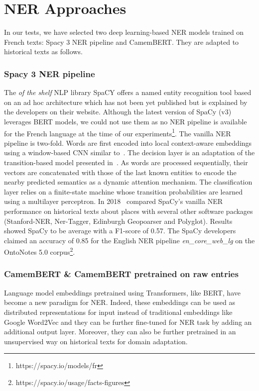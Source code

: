 \section{NER Approaches}

In our tests, we have selected two deep learning-based NER models trained on French texts: Spacy 3 NER pipeline and CamemBERT. They are adapted to  historical texts as follows.

\subsubsection{Spacy 3 NER pipeline}
The \textit{of the shelf} NLP library SpaCY offers a named entity recognition tool based on an ad hoc architecture which has not been yet published but is explained by the developers on their website. Although the latest version of SpaCy (v3) leverages BERT models, we could not use them as no NER pipeline is available for the French language at the time of our experiments\footnote{https://spacy.io/models/fr}.
The vanilla NER pipeline is two-fold. Words are first encoded into local context-aware embeddings using a window-based CNN similar to~\cite{collobert2011}.
The decision layer is an adaptation of the transition-based model presented in~\cite{lample2016}.
As words are processed sequentially, their vectors are concatenated with those of the last known entities to encode the nearby predicted semantics as a dynamic attention mechanism.
The classification layer relies on a finite-state machine whose transition probabilities are learned using a multilayer perceptron.
In 2018~\cite{won2018} compared SpaCy's vanilla NER performance on historical texts about places with several other software packages (Stanford-NER, Ner-Tagger, Edinburgh Geopoarser and Polyglot). Results showed SpaCy to be average with a F1-score of 0.57.
The SpaCy developers claimed an accuracy of 0.85 for the English NER pipeline \textit{en\_core\_web\_lg} on the OntoNotes 5.0 corpus\footnote{https://spacy.io/usage/facts-figures}.

\subsubsection{CamemBERT \& CamemBERT pretrained on raw entries}

Language model embeddings pretrained using Transformers, like BERT, have become a new paradigm for NER\cite{li2020}. Indeed, these embeddings can be used as distributed representations for input instead of traditional embeddings like Google Word2Vec and they can be further fine-tuned for NER task by adding an additional output layer. Moreover, they can also be further pretrained in an unsupervised way on historical texts for domain adaptation.

